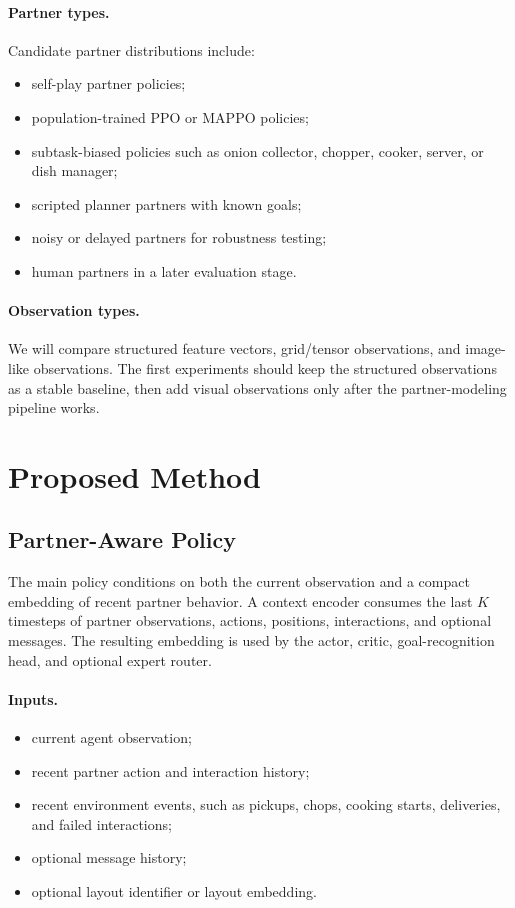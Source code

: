 \documentclass[letterpaper]{article} %
\begin{document}
\paragraph{Partner types.}
Candidate partner distributions include:
\begin{itemize}
    \item self-play partner policies;
    \item population-trained PPO or MAPPO policies;
    \item subtask-biased policies such as onion collector, chopper, cooker, server, or dish manager;
    \item scripted planner partners with known goals;
    \item noisy or delayed partners for robustness testing;
    \item human partners in a later evaluation stage.
\end{itemize}

\paragraph{Observation types.}
We will compare structured feature vectors, grid/tensor observations, and image-like observations. The first experiments should keep the structured observations as a stable baseline, then add visual observations only after the partner-modeling pipeline works.

\section{Proposed Method}

\subsection{Partner-Aware Policy}

The main policy conditions on both the current observation and a compact embedding of recent partner behavior. A context encoder consumes the last $K$ timesteps of partner observations, actions, positions, interactions, and optional messages. The resulting embedding is used by the actor, critic, goal-recognition head, and optional expert router.

\paragraph{Inputs.}
\begin{itemize}
    \item current agent observation;
    \item recent partner action and interaction history;
    \item recent environment events, such as pickups, chops, cooking starts, deliveries, and failed interactions;
    \item optional message history;
    \item optional layout identifier or layout embedding.
\end{itemize}
\end{document}
